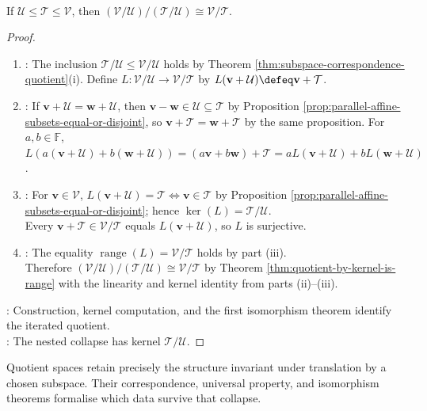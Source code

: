 \begin{theorem} \label{thm:third-isomorphism-vector-spaces} \\
If $\mathcal{U}\leq\mathcal{T}\leq\mathcal{V}$, then $(\mathcal{V}/\mathcal{U})/(\mathcal{T}/\mathcal{U})\cong\mathcal{V}/\mathcal{T}$.
\begin{proof}
\begin{enumerate}[label=(\roman*)]
\setlength{\itemsep}{0pt}
\item {}: The inclusion $\mathcal{T}/\mathcal{U}\leq\mathcal{V}/\mathcal{U}$ holds by Theorem \ref{thm:subspace-correspondence-quotient}(i). Define $L:\mathcal{V}/\mathcal{U}\to\mathcal{V}/\mathcal{T}$ by $L(\mathbf{v}+\mathcal{U})\defeq\mathbf{v}+\mathcal{T}$.
\item {}: If $\mathbf{v}+\mathcal{U}=\mathbf{w}+\mathcal{U}$, then $\mathbf{v}-\mathbf{w}\in\mathcal{U}\subseteq\mathcal{T}$ by Proposition \ref{prop:parallel-affine-subsets-equal-or-disjoint}, so $\mathbf{v}+\mathcal{T}=\mathbf{w}+\mathcal{T}$ by the same proposition. For $a,b\in\mathbb{F}$, $L(a(\mathbf{v}+\mathcal{U})+b(\mathbf{w}+\mathcal{U}))=(a\mathbf{v}+b\mathbf{w})+\mathcal{T}=aL(\mathbf{v}+\mathcal{U})+bL(\mathbf{w}+\mathcal{U})$.
\item {}: For $\mathbf{v}\in\mathcal{V}$, $L(\mathbf{v}+\mathcal{U})=\mathcal{T}\Longleftrightarrow\mathbf{v}\in\mathcal{T}$ by Proposition \ref{prop:parallel-affine-subsets-equal-or-disjoint}; hence $\ker(L)=\mathcal{T}/\mathcal{U}$.\\
Every $\mathbf{v}+\mathcal{T}\in\mathcal{V}/\mathcal{T}$ equals $L(\mathbf{v}+\mathcal{U})$, so $L$ is surjective.
\item {}: The equality $\operatorname{range}(L)=\mathcal{V}/\mathcal{T}$ holds by part (iii).\\
Therefore $(\mathcal{V}/\mathcal{U})/(\mathcal{T}/\mathcal{U})\cong\mathcal{V}/\mathcal{T}$ by Theorem \ref{thm:quotient-by-kernel-is-range} with the linearity and kernel identity from parts (ii)--(iii).
\end{enumerate}
: Construction, kernel computation, and the first isomorphism theorem identify the iterated quotient.\\
: The nested collapse has kernel $\mathcal{T}/\mathcal{U}$.
\end{proof}
\end{theorem}

Quotient spaces retain precisely the structure invariant under translation by a chosen subspace. Their correspondence, universal property, and isomorphism theorems formalise which data survive that collapse.
